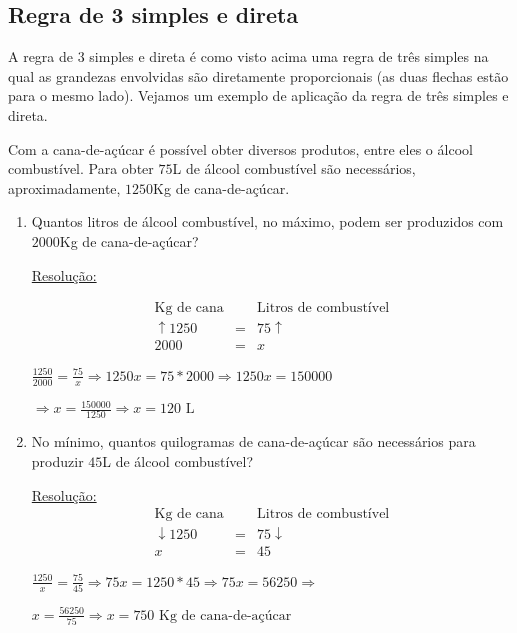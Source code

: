 \subsection{Regra de 3 simples e direta}

 A regra de 3 simples e direta é como visto acima uma regra de três simples na qual as grandezas envolvidas são diretamente proporcionais (as duas flechas estão para o mesmo lado). Vejamos um exemplo de aplicação da regra de três simples e direta.

\begin{exem}
 Com a cana-de-açúcar é possível obter diversos produtos, entre eles o álcool combustível. Para obter $75$L de álcool combustível são necessários, aproximadamente, $1250$Kg de cana-de-açúcar.
 \begin{enumerate}
  \item Quantos litros de álcool combustível, no máximo, podem ser produzidos com $2000$Kg de cana-de-açúcar?

 \underline{Resolução:}

 \begin{eqnarray*}
  \text{Kg de cana} & & \text{Litros de combustível} \\
  \uparrow 1250 & = & 75 \uparrow \\
  2000 & = & x
 \end{eqnarray*}

 $\frac{1250}{2000}= \frac{75}{x} \Rightarrow 1250 x = 75*2000 \Rightarrow 1250 x = 150000$

 $\Rightarrow x = \frac{150000}{1250} \Rightarrow x = 120 \text{ L}$
 \fim


  \item No mínimo, quantos quilogramas de cana-de-açúcar são necessários para produzir $45$L de álcool combustível?

  \underline{Resolução:}
  \begin{eqnarray*}
  \text{Kg de cana} & & \text{Litros de combustível} \\
  \downarrow 1250 & = & 75 \downarrow \\
  x & = & 45
 \end{eqnarray*}

 $\frac{1250}{x}=\frac{75}{45} \Rightarrow 75 x = 1250*45 \Rightarrow 75 x = 56250 \Rightarrow $

 $x = \frac{56250}{75} \Rightarrow x = 750 \text{ Kg de cana-de-açúcar}$
 \fim

 \end{enumerate}
\end{exem}


